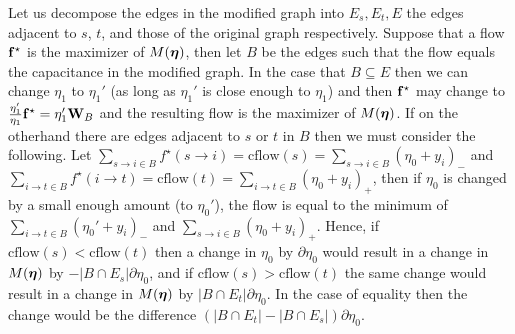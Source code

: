 Let us decompose the edges in the modified graph into $E_s, E_t, E$ the edges adjacent to $s$, $t$, and those of the original graph respectively.
Suppose that a flow $\mathbf{f}^\star$ is the maximizer of $M(\bm{\eta})$, then let $B$ be the edges such that the flow equals the capacitance in the modified graph.
In the case that $B \subseteq E$ then we can change $\eta_1$ to $\eta_1'$ (as long as $\eta_1'$ is close enough to $\eta_1$) and then $\mathbf{f}^\star$ may change to $\frac{\eta_1'}{\eta_1} \mathbf{f}^\star = \eta_1' \mathbf{W}_B$ and the resulting flow is the maximizer of $M(\bm{\eta})$.
If on the otherhand there are edges adjacent to $s$ or $t$ in $B$ then we must consider the following.
Let $\sum_{s\rightarrow i \in B} f^\star(s \rightarrow i) = \textrm{cflow}(s) = \sum_{s\rightarrow i \in B} (\eta_0 + y_i)_-$ and $\sum_{i\rightarrow t \in B} f^\star(i \rightarrow t) = \textrm{cflow}(t) = \sum_{i\rightarrow t \in B} (\eta_0 + y_i)_+$, then if $\eta_0$ is changed by a small enough amount (to $\eta_0'$), the flow is equal to the minimum of $\sum_{i\rightarrow t \in B} (\eta_0' + y_i)_-$ and $\sum_{s\rightarrow i \in B} (\eta_0 + y_i)_+$.
Hence, if $\textrm{cflow}(s) < \textrm{cflow}(t)$ then a change in $\eta_0$ by $\partial \eta_0$ would result in a change in $M(\bm{\eta})$ by $-|B \cap E_s| \partial \eta_0$, and if $\textrm{cflow}(s) > \textrm{cflow}(t)$ the same change would result in a change in $M(\bm{\eta})$ by $|B \cap E_t| \partial \eta_0$.
In the case of equality then the change would be the difference $(|B \cap E_t| - |B \cap E_s|) \partial \eta_0$.


